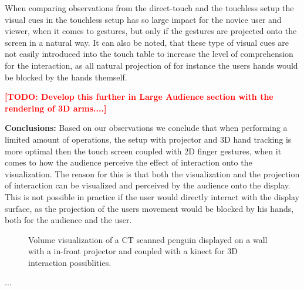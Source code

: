 \documentclass[review,journal]{vgtc}         %
\newcommand{\todo}[1]{\textbf{\textcolor{red}{[TODO: {#1}]}}}
\begin{document}
When comparing observations from the direct-touch and the touchless setup the visual cues in the touchless setup has so large impact for the novice user and viewer, when it comes to gestures, but only if the gestures are projected onto the screen in a natural way. It can also be noted, that these type of visual cues are not easily introduced into the touch table to increase the level of comprehension for the interaction, as all natural projection of for instance the users hands would be blocked by the hands themself.

\todo{Develop this further in Large Audience section with the rendering of 3D arms....}

\textbf{Conclusions:}
Based on our observations we conclude that when performing a limited amount of operations, the setup with projector and 3D hand tracking is more optimal then the touch screen coupled with 2D finger gestures, when it comes to how the audience perceive the effect of interaction onto the visualization. The reason for this is that both the visualization and the projection of interaction can be visualized and perceived by the audience onto the display. This is not possible in practice if the user would directly interact with the display surface, as the projection of the users movement would be blocked by his hands, both for the audience and the user.

\begin{figure}[htb]
	\centering
	\caption{Volume visualization of a CT scanned penguin displayed on a wall with a in-front projector and coupled with a kinect for 3D interaction possiblities.}
	\label{img:exhibition_kinect}
\end{figure}

...
\end{document}
